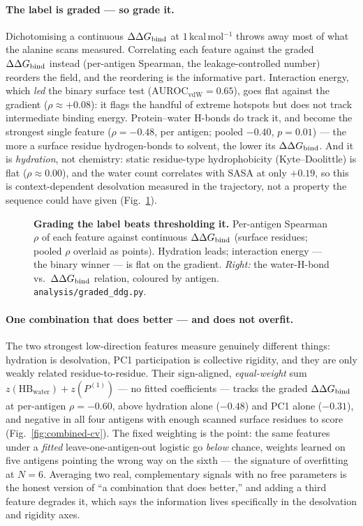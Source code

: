 \paragraph{The label is graded --- so grade it.} Dichotomising a continuous $\Delta\Delta G_{\mathrm{bind}}$ at $1$\,kcal\,mol$^{-1}$
throws away most of what the alanine scans measured. Correlating each feature against the graded $\Delta\Delta G_{\mathrm{bind}}$
instead (per-antigen Spearman, the leakage-controlled number) reorders the field, and the reordering is
the informative part. Interaction energy, which \emph{led} the binary surface test
($\mathrm{AUROC}_{\mathrm{vdW}}=0.65$), goes flat against the gradient ($\rho\approx+0.08$): it flags the
handful of extreme hotspots but does not track intermediate binding energy. Protein--water H-bonds do
track it, and become the strongest single feature ($\rho=-0.48$, per antigen; pooled $-0.40$, $p=0.01$)
--- the more a surface residue hydrogen-bonds to solvent, the lower its $\Delta\Delta G_{\mathrm{bind}}$. And it is
\emph{hydration}, not chemistry: static residue-type hydrophobicity (Kyte--Doolittle) is flat
($\rho\approx0.00$), and the water count correlates with SASA at only $+0.19$, so this is
context-dependent desolvation measured in the trajectory, not a property the sequence could have given
(Fig.~\ref{fig:graded-ddg}).

\begin{figure}[H]\centering
{}
\caption{\textbf{Grading the label beats thresholding it.} Per-antigen Spearman $\rho$ of each feature
against continuous $\Delta\Delta G_{\mathrm{bind}}$ (surface residues; pooled $\rho$ overlaid as points). Hydration leads;
interaction energy --- the binary winner --- is flat on the gradient. \emph{Right:} the water-H-bond
vs.\ $\Delta\Delta G_{\mathrm{bind}}$ relation, coloured by antigen. \texttt{analysis/graded\_ddg.py}.}
\label{fig:graded-ddg}
\end{figure}

\paragraph{One combination that does better --- and does not overfit.} The two strongest low-direction
features measure genuinely different things: hydration is desolvation, PC1 participation is collective
rigidity, and they are only weakly related residue-to-residue. Their sign-aligned, \emph{equal-weight}
sum $z(\mathrm{HB}_{\mathrm{water}})+z(P^{(1)})$ --- no fitted coefficients --- tracks the graded $\Delta\Delta G_{\mathrm{bind}}$
at per-antigen $\rho=-0.60$, above hydration alone ($-0.48$) and PC1 alone ($-0.31$), and negative in
all four antigens with enough scanned surface residues to score
(Fig.~\ref{fig:combined-cv}). The fixed weighting is the point: the same features under a
\emph{fitted} leave-one-antigen-out logistic go \emph{below} chance, weights learned on five antigens
pointing the wrong way on the sixth --- the signature of overfitting at $N=6$. Averaging two real,
complementary signals with no free parameters is the honest version of ``a combination that does
better,'' and adding a third feature degrades it, which says the information lives specifically in the
desolvation and rigidity axes.

